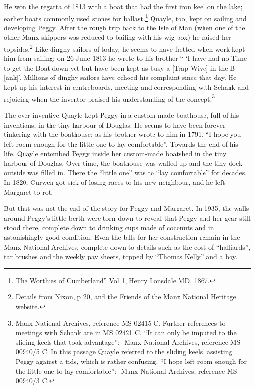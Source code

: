 \documentclass[
  letterpaper,
]{scrbook}
\begin{document}
He won the regatta of 1813 with a boat that had the first iron keel on
the lake; earlier boats commonly used stones for ballast.\footnote{The
  Worthies of Cumberland'' Vol 1, Henry Lonsdale MD, 1867.} Quayle, too,
kept on sailing and developing Peggy. After the rough trip back to the
Isle of Man (when one of the other Manx skippers was reduced to bailing
with his wig box) he raised her topsides.\footnote{Details from Nixon, p
  20, and the Friends of the Manx National Heritage website.} Like
dinghy sailors of today, he seems to have fretted when work kept him
from sailing; on 26 June 1803 he wrote to his brother `` `I have had no
Time to get the Boat down yet but have been kept as busy a {[}Trap
Wive{]} in the B {[}ank{]}'. Millions of dinghy sailors have echoed his
complaint since that day. He kept up his interest in centreboards,
meeting and corresponding with Schank and rejoicing when the inventor
praised his understanding of the concept.\footnote{Manx National
  Archives, reference MS 02415 C. Further references to meetings with
  Schank are in MS 02421 C. ``It can only be imputed to the sliding
  keels that took advantage'':- Manx National Archives, reference MS
  00940/5 C. In this passage Quayle referred to the sliding keels'
  assisting Peggy against a tide, which is rather confusing. ``I hope
  left room enough for the little one to lay comfortable'':- Manx
  National Archives, reference MS 00940/3 C.}

The ever-inventive Quayle kept Peggy in a custom-made boathouse, full of
his inventions, in the tiny harbour of Douglas. He seems to have been
forever tinkering with the boathouse; as his brother wrote to him in
1791, ``I hope you left room enough for the little one to lay
comfortable''. Towards the end of his life, Quayle entombed Peggy inside
her custom-made boatshed in the tiny harbour of Douglas. Over time, the
boathouse was walled up and the tiny dock outside was filled in. There
the ``little one'' was to ``lay comfortable'' for decades. In 1820,
Curwen got sick of losing races to his new neighbour, and he left
Margaret to rot.

But that was not the end of the story for Peggy and Margaret. In 1935,
the walls around Peggy's little berth were torn down to reveal that
Peggy and her gear still stood there, complete down to drinking cups
made of coconuts and in astonishingly good condition. Even the bills for
her construction remain in the Manx National Archives, complete down to
details such as the cost of ``halliards'', tar brushes and the weekly
pay sheets, topped by ``Thomas Kelly'' and a boy.
\end{document}

